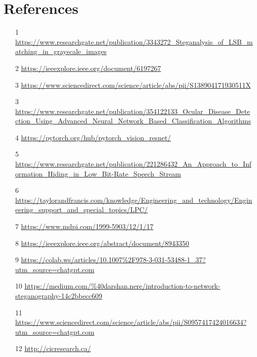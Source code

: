 \documentclass[12pt]{article}
\begin{document}
\newpage
\section{References}

\begin{itemize}
    \item [1] \url{https://www.researchgate.net/publication/3343272_Steganalysis_of_LSB_matching_in_grayscale_images}
    \item [2] \url{https://ieeexplore.ieee.org/document/6197267}
    \item  [3] \url{https://www.sciencedirect.com/science/article/abs/pii/S138904171930511X}
    \item  [3] \url{https://www.researchgate.net/publication/354122133_Ocular_Disease_Detection_Using_Advanced_Neural_Network_Based_Classification_Algorithms}
    \item [4] 
    \url{https://pytorch.org/hub/pytorch_vision_resnet/}
    \item[5]
    \url{https://www.researchgate.net/publication/221286432_An_Approach_to_Information_Hiding_in_Low_Bit-Rate_Speech_Stream}
    \item[6]
    \url{https://taylorandfrancis.com/knowledge/Engineering_and_technology/Engineering_support_and_special_topics/LPC/}
    \item[7]
    \url{https://www.mdpi.com/1999-5903/12/1/17}
    \item[8]
    \url{https://ieeexplore.ieee.org/abstract/document/8943350}

    \item[9]
    \url{https://colab.ws/articles/10.1007%2F978-3-031-53488-1_37?utm_source=chatgpt.com}

    \item[10]    \url{https://medium.com/%40darshan.nere/introduction-to-network-steganography-14c2bbecc609}

    \item[11]    \url{https://www.sciencedirect.com/science/article/abs/pii/S0957417424016634?utm_source=chatgpt.com}
    \item[12]    
    \url{http://cicresearch.ca/}
    
    
    
\end{itemize}
\end{document}
